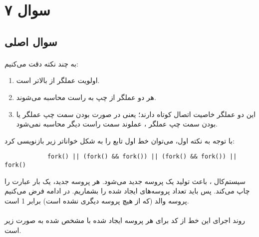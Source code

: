 \documentclass{article}
\begin{document}
	\section*{سوال ۷}
	\subsection*{سوال اصلی}
	\paragraph*{}
	به چند نکته دقت می‌کنیم:
	\begin{enumerate}
		\item
		اولویت عملگر
		\LRE{\verb|&&|}
		از
		\LRE{\verb/||/}
		بالاتر است.

		\item
		هر دو عملگر از چپ به راست محاسبه می‌شوند.

		\item

		این دو عملگر خاصیت اتصال کوتاه دارند؛ یعنی در صورت
		بودن سمت چپ عملگر
		\LRE{\verb/||/}
		یا
		بودن سمت چپ عملگر
		\LRE{\verb|&&|}،
		عملوند سمت راست دیگر محاسبه نمی‌شود.
	\end{enumerate}

	با توجه به نکته اول، می‌توان خط اول تابع
	را به شکل خوانا‌تر زیر بازنویسی کرد:
	\begin{latin}
		\begin{verbatim}
			fork() || (fork() && fork()) || (fork() && fork()) || fork()
		\end{verbatim}
	\end{latin}

	سیستم‌کال
	،
	باعث تولید یک پروسه جدید می‌شود. هر پروسه جدید، یک بار عبارت
	را چاپ می‌کند. پس باید تعداد پروسه‌های ایجاد شده را بشماریم. در ادامه فرض می‌کنیم
	پروسه والد (که از هیچ پروسه دیگری
	نشده است) برابر 1 است.

	\paragraph*{}
	روند اجرای این خط از کد برای هر پروسه ایجاد شده با
	مشخص شده به صورت زیر است.
\end{document}
